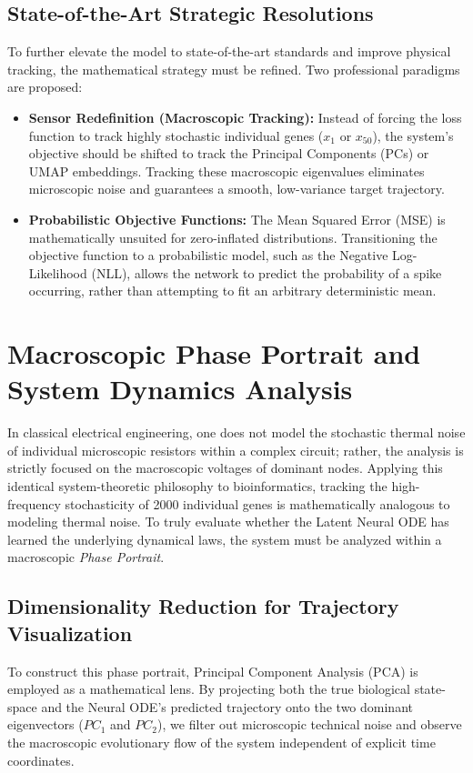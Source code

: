 \documentclass[12pt, a4paper]{article}
\begin{document}
	\subsection{State-of-the-Art Strategic Resolutions}
	To further elevate the model to state-of-the-art standards and improve physical tracking, the mathematical strategy must be refined. Two professional paradigms are proposed:
	\begin{itemize}
		\item \textbf{Sensor Redefinition (Macroscopic Tracking):} Instead of forcing the loss function to track highly stochastic individual genes ($x_1$ or $x_{50}$), the system's objective should be shifted to track the Principal Components (PCs) or UMAP embeddings. Tracking these macroscopic eigenvalues eliminates microscopic noise and guarantees a smooth, low-variance target trajectory.
		\item \textbf{Probabilistic Objective Functions:} The Mean Squared Error (MSE) is mathematically unsuited for zero-inflated distributions. Transitioning the objective function to a probabilistic model, such as the Negative Log-Likelihood (NLL), allows the network to predict the probability of a spike occurring, rather than attempting to fit an arbitrary deterministic mean.
	\end{itemize}
	
	\section{Macroscopic Phase Portrait and System Dynamics Analysis}
	
	In classical electrical engineering, one does not model the stochastic thermal noise of individual microscopic resistors within a complex circuit; rather, the analysis is strictly focused on the macroscopic voltages of dominant nodes. Applying this identical system-theoretic philosophy to bioinformatics, tracking the high-frequency stochasticity of 2000 individual genes is mathematically analogous to modeling thermal noise. To truly evaluate whether the Latent Neural ODE has learned the underlying dynamical laws, the system must be analyzed within a macroscopic \textit{Phase Portrait}.
	
	\subsection{Dimensionality Reduction for Trajectory Visualization}
	To construct this phase portrait, Principal Component Analysis (PCA) is employed as a mathematical lens. By projecting both the true biological state-space and the Neural ODE's predicted trajectory onto the two dominant eigenvectors ($PC_1$ and $PC_2$), we filter out microscopic technical noise and observe the macroscopic evolutionary flow of the system independent of explicit time coordinates.
	
\end{document}

